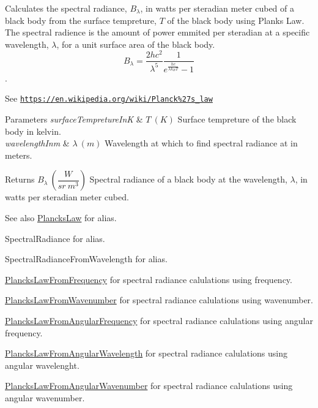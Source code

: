 Calculates the spectral radiance, $B_{\lambda}$, in watts per steradian meter cubed of a black body from the surface tempreture, $T$ of the black body using Plank\textquotesingle{}s Law. The spectral radience is the amount of power emmited per steradian at a specific wavelength, $\lambda$, for a unit surface area of the black body. \[ B_{\lambda} = \dfrac{2 h c^2}{\lambda^5} \dfrac{1}{e^{\frac{hc}{\lambda k_B T}} - 1} \]. 

See \href{https://en.wikipedia.org/wiki/Planck%27s_law}{\tt https\+://en.\+wikipedia.\+org/wiki/\+Planck\%27s\+\_\+law}


\begin{DoxyParams}{Parameters}
{\em surface\+Tempreture\+InK} & $T\ (K)$ Surface tempreture of the black body in kelvin. \\
\hline
{\em wavelength\+Inm} & $\lambda\ (m)$ Wavelength at which to find spectral radiance at in meters. \\
\hline
\end{DoxyParams}
\begin{DoxyReturn}{Returns}
$B_{\lambda}\ ( \dfrac{W}{sr\ m^3})$ Spectral radiance of a black body at the wavelength, $\lambda$, in watts per steradian meter cubed. 
\end{DoxyReturn}
\begin{DoxySeeAlso}{See also}
\mbox{\hyperlink{group___e_g_x_phys-_electrodynamics-_black_body-_plancks_law_ga44d8dc3e072ffc7d860cd8f07463f091}{Plancks\+Law}} for alias. 

Spectral\+Radiance for alias. 

Spectral\+Radiance\+From\+Wavelength for alias. 

\mbox{\hyperlink{group___e_g_x_phys-_electrodynamics-_black_body-_plancks_law_ga68aae82f8a086831358c4a61c8c80ba4}{Plancks\+Law\+From\+Frequency}} for spectral radiance calulations using frequency. 

\mbox{\hyperlink{group___e_g_x_phys-_electrodynamics-_black_body-_plancks_law_ga6648ae2a0fbff6735c1e1a04c7cac746}{Plancks\+Law\+From\+Wavenumber}} for spectral radiance calulations using wavenumber. 

\mbox{\hyperlink{group___e_g_x_phys-_electrodynamics-_black_body-_plancks_law_gaac540560c71e30c02b91d22e417b5863}{Plancks\+Law\+From\+Angular\+Frequency}} for spectral radiance calulations using angular frequency. 

\mbox{\hyperlink{group___e_g_x_phys-_electrodynamics-_black_body-_plancks_law_ga7322124727f968d28807e918c5eeb23f}{Plancks\+Law\+From\+Angular\+Wavelength}} for spectral radiance calulations using angular wavelenght. 

\mbox{\hyperlink{group___e_g_x_phys-_electrodynamics-_black_body-_plancks_law_gaa3d3e0fdb77d25bdd40523f9975de902}{Plancks\+Law\+From\+Angular\+Wavenumber}} for spectral radiance calulations using angular wavenumber. 
\end{DoxySeeAlso}
